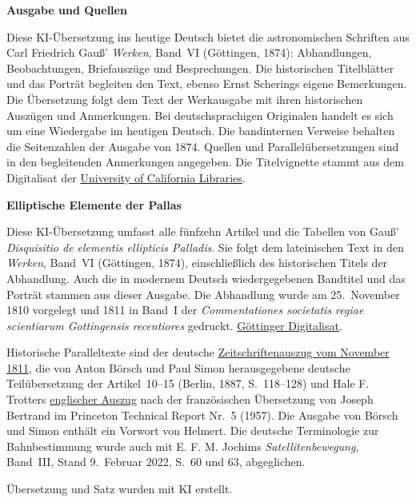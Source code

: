 \thispagestyle{empty}
\begin{center}\textbf{Ausgabe und Quellen}\end{center}
\noindent Diese KI-Übersetzung ins heutige Deutsch bietet die astronomischen Schriften aus Carl Friedrich Gauß’ \textit{Werken}, Band~VI (Göttingen, 1874): Abhandlungen, Beobachtungen, Briefauszüge und Besprechungen. Die historischen Titelblätter und das Porträt begleiten den Text, ebenso Ernst Scherings eigene Bemerkungen. Die Übersetzung folgt dem Text der Werkausgabe mit ihren historischen Auszügen und Anmerkungen. Bei deutschsprachigen Originalen handelt es sich um eine Wiedergabe im heutigen Deutsch. Die bandinternen Verweise behalten die Seitenzahlen der Ausgabe von 1874. Quellen und Parallelübersetzungen sind in den begleitenden Anmerkungen angegeben. Die Titelvignette stammt aus dem Digitalisat der \href{https://archive.org/details/werkecarlf06gausrich/page/n8/mode/1up}{University of California Libraries}.
\par\medskip\noindent\textbf{Elliptische Elemente der Pallas}
\par\smallskip
\noindent Diese KI-Übersetzung umfasst alle fünfzehn Artikel und die Tabellen von Gauß’ \textit{Disquisitio de elementis ellipticis Palladis}. Sie folgt dem lateinischen Text in den \textit{Werken}, Band~VI (Göttingen, 1874), einschließlich des historischen Titels der Abhandlung. Auch die in modernem Deutsch wiedergegebenen Bandtitel und das Porträt stammen aus dieser Ausgabe. Die Abhandlung wurde am 25.~November 1810 vorgelegt und 1811 in Band~I der \textit{Commentationes societatis regiae scientiarum Gottingensis recentiores} gedruckt. \href{https://gdz.sub.uni-goettingen.de/id/PPN236007467}{Göttinger Digitalisat}.
\par\smallskip\noindent Historische Paralleltexte sind der deutsche \href{https://www.digitale-sammlungen.de/de/view/bsb10538613?page=463}{Zeitschriftenauszug vom November 1811}, die von Anton Börsch und Paul Simon herausgegebene deutsche Teilübersetzung der Artikel~10--15 (Berlin, 1887, S.~118--128) und Hale F. Trotters \href{https://www.york.ac.uk/depts/maths/histstat/gausspallas.htm}{englischer Auszug} nach der französischen Übersetzung von Joseph Bertrand im Princeton Technical Report Nr.~5 (1957). Die Ausgabe von Börsch und Simon enthält ein Vorwort von Helmert. Die deutsche Terminologie zur Bahnbestimmung wurde auch mit E. F. M. Jochims \textit{Satellitenbewegung}, Band~III, Stand 9.~Februar 2022, S.~60 und 63, abgeglichen.
\par\smallskip\noindent Übersetzung und Satz wurden mit KI erstellt.
\clearpage
